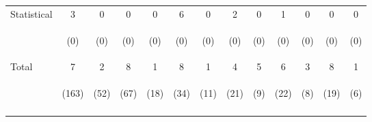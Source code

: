 \begin{tabular}{lcccccccccccc}
\noalign{\smallskip}Statistical & 3 & 0 & 0 & 0 & 6 & 0 & 2 & 0 & 1 & 0 & 0 & 0\\
 & \begin{footnotesize}(0)\end{footnotesize} & \begin{footnotesize}(0)\end{footnotesize} & \begin{footnotesize}(0)\end{footnotesize} & \begin{footnotesize}(0)\end{footnotesize} & \begin{footnotesize}(0)\end{footnotesize} & \begin{footnotesize}(0)\end{footnotesize} & \begin{footnotesize}(0)\end{footnotesize} & \begin{footnotesize}(0)\end{footnotesize} & \begin{footnotesize}(0)\end{footnotesize} & \begin{footnotesize}(0)\end{footnotesize} & \begin{footnotesize}(0)\end{footnotesize} & \begin{footnotesize}(0)\end{footnotesize}\\
\noalign{\smallskip}Total & 7 & 2 & 8 & 1 & 8 & 1 & 4 & 5 & 6 & 3 & 8 & 1\\
 & \begin{footnotesize}(163)\end{footnotesize} & \begin{footnotesize}(52)\end{footnotesize} & \begin{footnotesize}(67)\end{footnotesize} & \begin{footnotesize}(18)\end{footnotesize} & \begin{footnotesize}(34)\end{footnotesize} & \begin{footnotesize}(11)\end{footnotesize} & \begin{footnotesize}(21)\end{footnotesize} & \begin{footnotesize}(9)\end{footnotesize} & \begin{footnotesize}(22)\end{footnotesize} & \begin{footnotesize}(8)\end{footnotesize} & \begin{footnotesize}(19)\end{footnotesize} & \begin{footnotesize}(6)\end{footnotesize}\\
\noalign{\smallskip}\hline\end{tabular}\\
